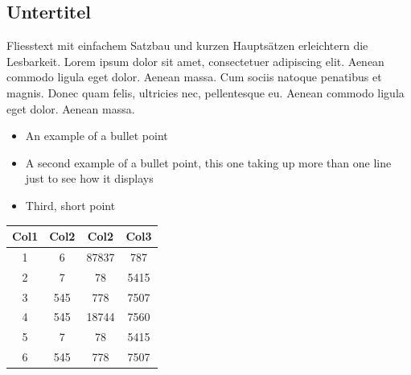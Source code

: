 \documentclass[a0,portrait]{a0poster}
\begin{document}

\begin{multicols}{3} %


\section{Untertitel}

\large
Fliesstext mit einfachem Satzbau und kurzen Hauptsätzen erleichtern die Lesbarkeit. Lorem ipsum dolor sit amet, consectetuer adipiscing elit. Aenean commodo ligula eget dolor. Aenean massa. Cum sociis natoque penatibus et magnis. Donec quam felis, ultricies nec, pellentesque eu. Aenean commodo ligula eget dolor. Aenean massa.

\begin{itemize}
\item An example of a bullet point
\item A second example of a bullet point, this one taking up more than one line just to see how it displays
\item Third, short point
\end{itemize}
\blindtext
\begin{center}
 \vspace{2cm}
 \begin{tabular}{c c c c} 
  \toprule
  Col1 & Col2 & Col2 & Col3 \\ [0.5ex] 
  \midrule
  1 & 6 & 87837 & 787 \\ 
  2 & 7 & 78 & 5415 \\
  3 & 545 & 778 & 7507 \\
  4 & 545 & 18744 & 7560 \\
  5 & 7 & 78 & 5415 \\
  6 & 545 & 778 & 7507 \\
  \bottomrule
 \end{tabular}
\vspace{2cm}
\end{center}



\end{multicols}
\end{document}
